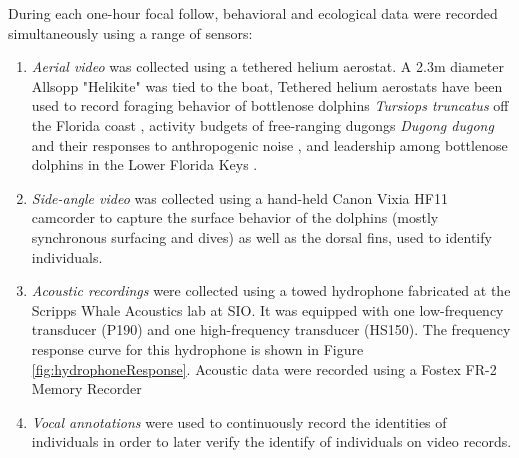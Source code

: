\documentclass[11pt]{amsart}
\begin{document}
During each one-hour focal follow, behavioral and ecological data were recorded simultaneously using a range of sensors: 
\begin{enumerate}[label*=\arabic*.]

\item \emph{Aerial video} was collected using a tethered helium aerostat. A 2.3m diameter Allsopp "Helikite" was tied to the boat, 
Tethered helium aerostats have been used to record foraging behavior of bottlenose dolphins \emph{Tursiops truncatus} off the Florida coast \citep{nowacek:2002}, activity budgets of free-ranging dugongs \emph{Dugong dugong} %
and their responses to anthropogenic noise \citep{hodgson:2004}, and leadership among bottlenose dolphins in the Lower Florida Keys \citep{lewis:2011}. 

\item \emph{Side-angle video} was collected using a hand-held Canon Vixia HF11 camcorder to capture the surface behavior of the dolphins (mostly synchronous surfacing and dives) as well as the dorsal fins, used to identify individuals.

\item \emph{Acoustic recordings} were collected using a towed hydrophone fabricated at the Scripps Whale Acoustics lab at SIO. It was equipped with one low-frequency transducer (P190) and one high-frequency transducer (HS150). The frequency response curve for this hydrophone is shown in Figure \ref{fig:hydrophoneResponse}. Acoustic data were recorded using a Fostex FR-2 Memory Recorder %

\item \emph{Vocal annotations} were used to continuously record the identities of individuals in order to later verify the identify of individuals on video records. 


\end{enumerate}
\end{document}
